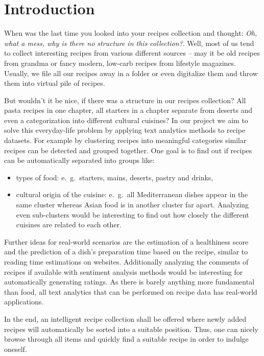 \documentclass[
     12pt,         %
     a4paper,      %
     BCOR10mm,     %
     DIV14,        %
     ]{article}
\begin{document}

\section{Introduction}

When was the last time you looked into your recipes collection and thought: \emph{Oh, what a mess, why is there no structure in this collection?}. Well, most of us tend to collect interesting recipes from various different sources -- may it be old recipes from grandma or fancy modern, low-carb recipes from lifestyle magazines. Usually, we file all our recipes away in a folder or even digitalize them and throw them into virtual pile of recipes.

But wouldn't it be nice, if there was a structure in our recipes collection? All pasta recipes in one chapter, all starters in a chapter separate from deserts and even a categorization into different cultural cuisines? In our project we aim to solve this everyday-life problem by applying text analytics methods to recipe datasets. For example by clustering recipes into meaningful categories similar recipes can be detected and grouped together. One goal is to find out if recipes can be automatically separated into groups like:
\begin{itemize}
  \item types of food: e.~g.~starters, mains, deserts, pastry and drinks,
  \item cultural origin of the cuisine: e.~g.~all Mediterranean dishes appear in the same cluster whereas Asian food is in another cluster far apart. Analyzing even sub-clusters would be interesting to find out how closely the different cuisines are related to each other.
\end{itemize}

Further ideas for real-world scenarios are the estimation of a healthiness score and the prediction of a dish's preparation time based on the recipe, similar to reading time estimations on websites. Additionally analyzing the comments of recipes if available with sentiment analysis methods would be interesting for automatically generating ratings. As there is barely anything more fundamental than food, all text analytics that can be performed on recipe data has real-world applications.


In the end, an intelligent recipe collection shall be offered where newly added recipes will automatically be sorted into a suitable position. Thus, one can nicely browse through all items and quickly find a suitable recipe in order to indulge oneself.
\end{document}
